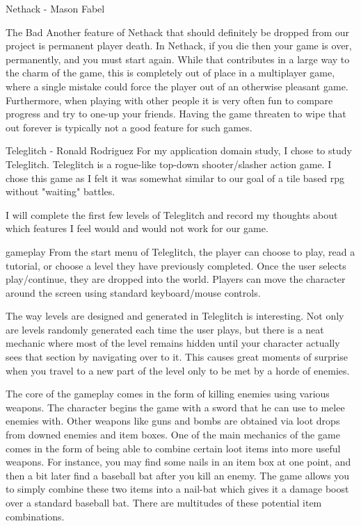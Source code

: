 \documentclass[12pt]{report}
\begin{document}
\begin{section}{Nethack - Mason Fabel}
\begin{subsection}{The Bad}
Another feature of Nethack that should definitely be dropped from our
project is permanent player death. In Nethack, if you die then your game is
over, permanently, and you must start again. While that contributes in a
large way to the charm of the game, this is completely out of place in a
multiplayer game, where a single mistake could force the player out of an
otherwise pleasant game. Furthermore, when playing with other people it
is very often fun to compare progress and try to one-up your friends.
Having the game threaten to wipe that out forever is typically not a good
feature for such games.
\end{subsection}

\end{section}

\begin{section}{Teleglitch - Ronald Rodriguez}
For my application domain study, I chose to study Teleglitch. Teleglitch 
is a rogue-like top-down shooter/slasher action game. I chose this game 
as I felt it was somewhat similar to our goal of a tile based rpg without 
"waiting" battles.

I will complete the first few levels of Teleglitch and record my thoughts 
about which features I feel would and would not work for our 
game. 

\begin{subsection}{gameplay}
From the start menu of Teleglitch, the player can choose to play, read a 
tutorial, or choose a level they have previously completed. Once the 
user selects play/continue, they are dropped into the world. Players can move 
the character around the screen using standard keyboard/mouse controls. 

The way levels are designed and generated in Teleglitch is interesting. Not 
only are levels randomly generated each time the user plays, but there is a 
neat mechanic where most of the level remains hidden until your character 
actually sees that section by navigating over to it. This causes great 
moments of surprise when you travel to a new part of the level only to be 
met by a horde of enemies. 

The core of the gameplay comes in the form of killing enemies using various 
weapons. The character begins the game with a sword that he can use to melee 
enemies with. Other weapons like guns and bombs are obtained via loot drops 
from downed enemies and item boxes. One of the main mechanics of the game comes 
in the form of being able to combine certain loot items into more useful weapons. 
For instance, you may find some nails in an item box at one point, and then a bit 
later find a baseball bat after you kill an enemy. The game allows you to simply 
combine these two items into a nail-bat which gives it a damage boost over a 
standard baseball bat. There are multitudes of these potential item combinations. 


\end{subsection}
\end{section}
\end{document}
